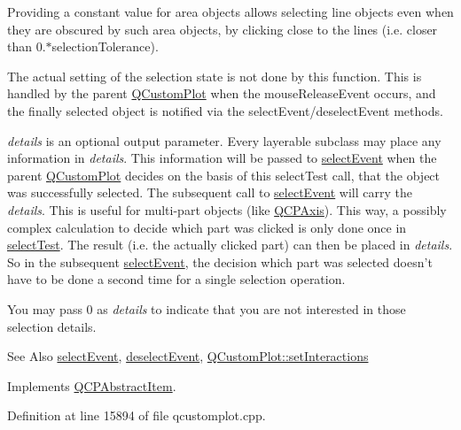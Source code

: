 Providing a constant value for area objects allows selecting line objects even when they are obscured by such area objects, by clicking close to the lines (i.\-e. closer than 0.$\ast$selection\-Tolerance).

The actual setting of the selection state is not done by this function. This is handled by the parent \hyperlink{class_q_custom_plot}{Q\-Custom\-Plot} when the mouse\-Release\-Event occurs, and the finally selected object is notified via the select\-Event/deselect\-Event methods.

{\itshape details} is an optional output parameter. Every layerable subclass may place any information in {\itshape details}. This information will be passed to \hyperlink{class_q_c_p_abstract_item_aaf92af7b9893712959a6c073d334d88d}{select\-Event} when the parent \hyperlink{class_q_custom_plot}{Q\-Custom\-Plot} decides on the basis of this select\-Test call, that the object was successfully selected. The subsequent call to \hyperlink{class_q_c_p_abstract_item_aaf92af7b9893712959a6c073d334d88d}{select\-Event} will carry the {\itshape details}. This is useful for multi-\/part objects (like \hyperlink{class_q_c_p_axis}{Q\-C\-P\-Axis}). This way, a possibly complex calculation to decide which part was clicked is only done once in \hyperlink{class_q_c_p_item_pixmap_a9f8436aa141fa0fb504191c882c2f4d9}{select\-Test}. The result (i.\-e. the actually clicked part) can then be placed in {\itshape details}. So in the subsequent \hyperlink{class_q_c_p_abstract_item_aaf92af7b9893712959a6c073d334d88d}{select\-Event}, the decision which part was selected doesn't have to be done a second time for a single selection operation.

You may pass 0 as {\itshape details} to indicate that you are not interested in those selection details.

\begin{DoxySeeAlso}{See Also}
\hyperlink{class_q_c_p_abstract_item_aaf92af7b9893712959a6c073d334d88d}{select\-Event}, \hyperlink{class_q_c_p_abstract_item_a91f090d6763cfedb0749219c63788ae9}{deselect\-Event}, \hyperlink{class_q_custom_plot_a5ee1e2f6ae27419deca53e75907c27e5}{Q\-Custom\-Plot\-::set\-Interactions} 
\end{DoxySeeAlso}


Implements \hyperlink{class_q_c_p_abstract_item_a96d522d10ffc0413b9a366c6f7f0476b}{Q\-C\-P\-Abstract\-Item}.



Definition at line 15894 of file qcustomplot.\-cpp.

